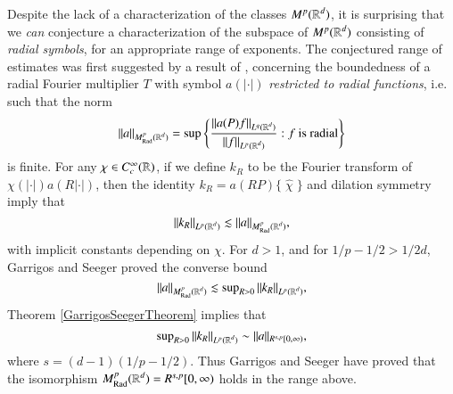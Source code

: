 Despite the lack of a characterization of the classes $M^p(\operatorname{\mathbb{R}}^d)$, it is surprising that we \emph{can} conjecture a characterization of the subspace of $M^p(\operatorname{\mathbb{R}}^d)$ consisting of \emph{radial symbols}, for an appropriate range of exponents. The conjectured range of estimates was first suggested by a result of \cite{GarrigosandSeeger}, concerning the boundedness of a radial Fourier multiplier $T$ with symbol $a(|\cdot|)$ \emph{restricted to radial functions}, i.e. such that the norm
%
\[ \| a \|_{M^p_{\text{Rad}}(\operatorname{\mathbb{R}}^d)} = \sup \left\{ \frac{\| a(P)f \|_{L^q(\operatorname{\mathbb{R}}^d)}}{\| f \|_{L^p(\operatorname{\mathbb{R}}^d)}} : \text{$f$ is radial} \right\} \]
%
is finite. For any $\chi \in C_c^\infty(\operatorname{\mathbb{R}})$, if we define $k_R$ to be the Fourier transform of $\chi(|\cdot|) a(R |\cdot|)$, then the identity $k_R = a(RP) \{\;\! \widehat{\chi}\;\! \}$ and dilation symmetry imply that
%
\begin{equation}
  \| k_R \|_{L^p(\operatorname{\mathbb{R}}^d)} \lesssim \| a \|_{M^p_{\text{Rad}}(\operatorname{\mathbb{R}}^d)},
\end{equation}
%
with implicit constants depending on $\chi$. For $d > 1$, and for $1/p - 1/2 > 1/2d$, Garrigos and Seeger proved \cite{GarrigosandSeeger} the converse bound
%
\begin{equation} \label{RadialMultiplierRadialBound}
    \| a \|_{M^p_{\text{Rad}}(\operatorname{\mathbb{R}}^d)} \lesssim \sup\nolimits_{R > 0} \| k_R \|_{L^p(\operatorname{\mathbb{R}}^d)},
\end{equation}
%
Theorem \ref{GarrigosSeegerTheorem} implies that
%
\begin{equation}
  \sup\nolimits_{R > 0} \| k_R \|_{L^p(\operatorname{\mathbb{R}}^d)} \sim \| a \|_{R^{s,p}[0,\infty)},
\end{equation}
%
where $s = (d-1)(1/p - 1/2)$. Thus Garrigos and Seeger have proved that the isomorphism $M^p_{\text{Rad}}(\operatorname{\mathbb{R}}^d) = R^{s,p}[0,\infty)$ holds in the range above.


